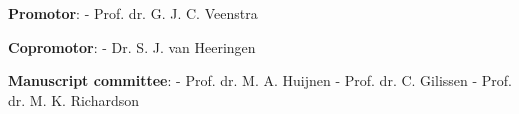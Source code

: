 \newpage

{\parindent0pt
\textbf{Promotor}:\newline
- Prof. dr. G. J. C. Veenstra
\vspace{0.5cm}

\textbf{Copromotor}:\newline
- Dr. S. J. van Heeringen
\vspace{0.5cm}

\textbf{Manuscript committee}:\newline
- Prof. dr. M. A. Huijnen \newline
- Prof. dr. C. Gilissen \newline
- Prof. dr. M. K. Richardson \newline
}
\newpage

\setcounter{tocdepth}{0}
\tableofcontents
